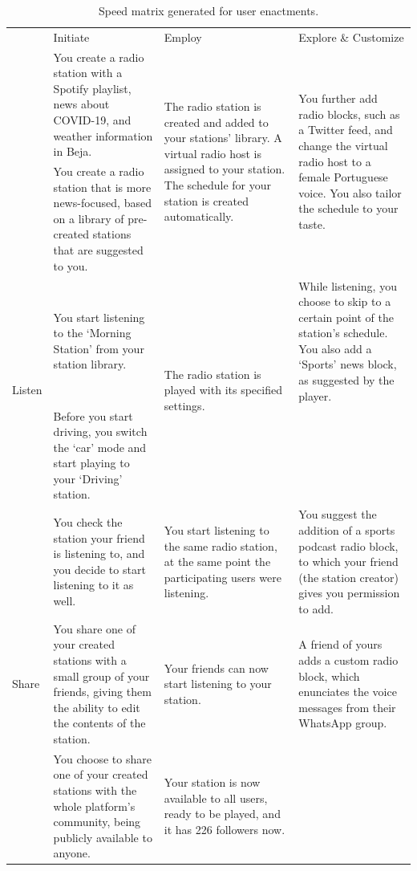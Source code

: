 \begin{table}[]

\begin{tabularx}{\columnwidth}{|l|X|X|X|}
\centering
\hline
\multirow{3}{*}{Create} &
  Initiate &
  Employ &
  Explore \& Customize \\ \cline{2-4} 
 &
  You create a radio station with a Spotify playlist, news about COVID-19, and weather information in Beja. &
  \multirow{2}{2.3cm}{The radio station is created and added to your stations’ library. A virtual radio host is assigned to your station. The schedule for your station is created automatically.} &
  \multirow{2}{2.3cm}{You further add radio blocks, such as a Twitter feed, and change the virtual radio host to a female Portuguese voice. You also tailor the schedule to your taste.} \\ \cline{2-2}
 &
  You create a radio station that is more news-focused, based on a library of pre-created stations that are suggested to you. &
   &
   \\ \hline
\multirow{2}{*}{Listen} &
  You start listening to the ‘Morning Station’ from your station library. &
  \multirow{2}{2.3cm}{The radio station is played with its specified settings.} &
  While listening, you choose to skip to a certain point of the station’s schedule. You also add a ‘Sports’ news block, as suggested by the player. \\ \cline{2-2} \cline{4-4} 
 &
  Before you start driving, you switch the ‘car’ mode and start playing to your ‘Driving’ station. &
   &
   \\ \hline
\multirow{3}{*}{Share} &
  You check the station your friend is listening to, and you decide to start listening to it as well. &
  You start listening to the same radio station, at the same point the participating users were listening. &
  You suggest the addition of a sports podcast radio block, to which your friend (the station creator) gives you permission to add. \\ \cline{2-4} 
 &
  You share one of your created stations with a small group of your friends, giving them the ability to edit the contents of the station. &
  Your friends can now start listening to your station. &
  A friend of yours adds a custom radio block, which enunciates the voice messages from their WhatsApp group. \\ \cline{2-4} 
 &
  You choose to share one of your created stations with the whole platform’s community, being publicly available to anyone. &
  Your station is now available to all users, ready to be played, and it has 226 followers now. &
   \\ \hline
\end{tabularx}
\caption{Speed matrix generated for user enactments.}
\label{tab:sdmatrix}
\vspace{-4mm}
\end{table}


